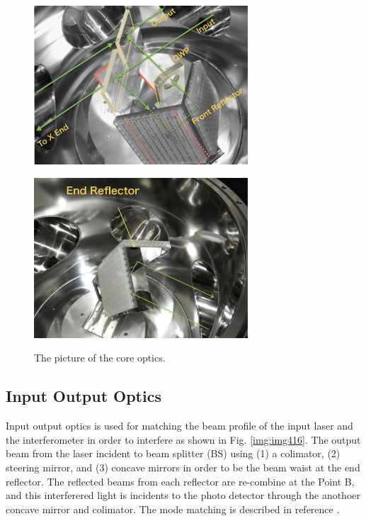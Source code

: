\begin{figure}[p]
  \begin{minipage}[b]{0.5\hsize}
    \begin{center}   
      \includegraphics[width=8cm]{./img_chap4/img418.png} %
      \label{img:img418}
    \end{center}
  \end{minipage}\hspace{0.1cm}
  \begin{minipage}[b]{0.5\hsize}
    \begin{center}   
      \includegraphics[width=8cm]{./img_chap4/img419.png} %
      \label{img:img419}
    \end{center}
  \end{minipage}
  \caption{The picture of the core optics.}  
\end{figure}


\subsection{Input Output Optics}
Input output optics is used for matching the beam profile of the input laser and the interferometer in order to interfere as shown in Fig. \ref{img:img416}. The output beam from the laser incident to beam splitter (BS) using (1) a colimator, (2) steering mirror, and (3) concave mirrors in order to be the beam waist at the end reflector. The reflected beams from each reflector are re-combine at the Point B, and this interferered light is incidents to the photo detector through the anothoer concave mirror and colimator. The mode matching is described in reference \cite{miyo2017baseline}.


